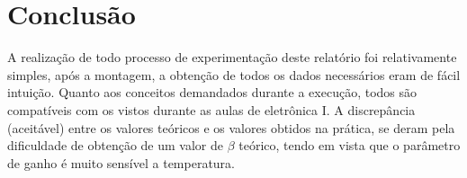 \chapter{Conclus\~{a}o}
A realização de todo processo de experimentação deste relatório foi relativamente simples, após a montagem, a obtenção de todos os dados necessários eram de fácil intuição. Quanto aos conceitos demandados durante a execução, todos são compatíveis com os vistos durante as aulas de eletrônica I.
A discrepância (aceitável) entre os valores teóricos e os valores obtidos na prática, se deram pela dificuldade de obtenção de um valor de $\beta$ teórico, tendo em vista que o parâmetro de ganho é muito sensível a temperatura. 
